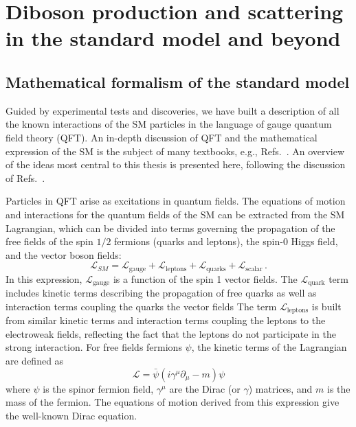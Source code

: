 \chapter{Diboson production and scattering in the standard model and beyond}
\label{ch:phenomenology}

\section{Mathematical formalism of the standard model}
\label{sec:formalism}

Guided by experimental tests and
discoveries, we have built a description of all the known interactions 
of the SM particles in the language of gauge quantum field theory (QFT).
An in-depth discussion of QFT and the mathematical expression of the SM is
the subject of many textbooks, e.g., 
Refs.~\cite{Aitchison:2003tq,Srednicki:2007qs,Peskin:1995ev,Halzen:1984mc,Barger:1987nn}. 
An overview of the ideas
most central to this thesis is presented here, following the discussion
of Refs.~\cite{Quigg:2009vq,Peskin:1995ev}.

Particles in QFT arise as excitations in quantum fields.
The equations of motion and interactions for the quantum fields of the SM can
be extracted from the SM Lagrangian, which can be divided into 
terms governing the propagation of the free fields of the spin $1/2$ 
fermions (quarks and leptons), the spin-0 Higgs field, and the vector boson fields:
\begin{equation}
  \mathcal{L}_{SM} = \mathcal{L}_{\text{gauge}} + \mathcal{L}_{\text{leptons}} + 
      \mathcal{L}_{\text{quarks}} + \mathcal{L}_{\text{scalar}} \,.
  \label{eq:smlagrangian}
\end{equation}
In this expression, $\mathcal{L}_{\text{gauge}}$ is a function of the 
spin 1 vector fields.
The $\mathcal{L}_{\text{quark}}$ term includes kinetic terms describing the 
propagation of free quarks as well as interaction terms coupling the quarks
the vector fields
The term $\mathcal{L}_{\text{leptons}}$ is built from similar kinetic terms and 
interaction terms coupling the leptons to the electroweak fields, reflecting
the fact that the leptons do not participate in the strong interaction.
For free fields fermions $\psi$, the kinetic terms of the Lagrangian are defined as
\begin{equation}
  \mathcal{L} = \bar{\psi}(i\gamma^{\mu}\partial_\mu - m)\psi
  \label{eq:freeFermion}
\end{equation}
where $\psi$ is the spinor fermion field, $\gamma^{\mu}$ are the 
Dirac (or $\gamma$) matrices, and $m$ is the mass of the fermion. 
The equations of motion derived from this expression give the well-known
Dirac equation.


